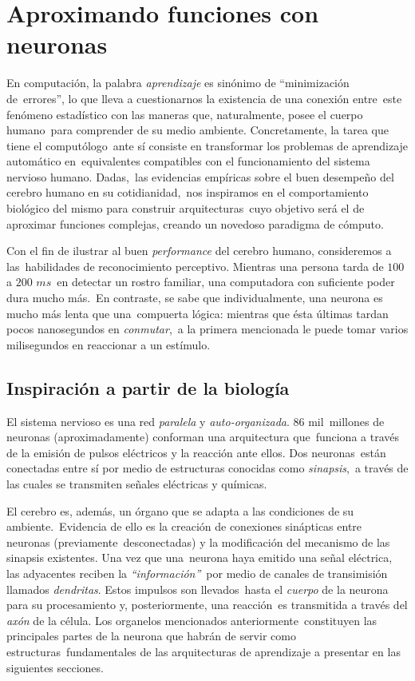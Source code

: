\section{Aproximando funciones con neuronas}

\noindent
En computación, la palabra \emph{aprendizaje} es sinónimo de ``minimización de\
errores'', lo que lleva a cuestionarnos la existencia de una conexión entre\
este fenómeno estadístico con las maneras que, naturalmente, posee el cuerpo humano\
para comprender de su medio ambiente. Concretamente, la tarea que tiene el computólogo\
ante sí consiste en transformar los problemas de aprendizaje automático en\
equivalentes compatibles con el funcionamiento del sistema nervioso humano. Dadas,\
las evidencias empíricas sobre el buen desempeño del cerebro humano en su cotidianidad,\
nos inspiramos en el comportamiento biológico del mismo para construir arquitecturas\
cuyo objetivo será el de aproximar funciones complejas, creando un novedoso paradigma de cómputo.\par
Con el fin de ilustrar al buen \emph{performance} del cerebro humano, consideremos a las\
habilidades de reconocimiento perceptivo. Mientras una persona tarda de $100$ a $200$ $ms$\
en detectar un rostro familiar, una computadora con suficiente poder dura mucho más.\cite{haykin2009}\
En contraste, se sabe que individualmente, una neurona es mucho más lenta que una\
compuerta lógica: mientras que ésta últimas tardan pocos nanosegundos en \emph{conmutar},\
a la primera mencionada le puede tomar varios milisegundos en reaccionar a un estímulo.

\subsection{Inspiración a partir de la biología}

\noindent
El sistema nervioso es una red \emph{paralela} y \emph{auto-organizada}. $86$ mil\
millones de neuronas (aproximadamente) \cite{website:nature:scitable} conforman una arquitectura que\
funciona a través de la emisión de pulsos eléctricos y la reacción ante ellos. Dos neuronas\
están conectadas entre sí por medio de estructuras conocidas como \emph{sinapsis},\
a través de las cuales se transmiten señales eléctricas y químicas.\par
El cerebro es, además, un órgano que se adapta a las condiciones de su ambiente.\
Evidencia de ello es la creación de conexiones sinápticas entre neuronas (previamente\
desconectadas) y la modificación del mecanismo de las sinapsis existentes. Una vez que una\
neurona haya emitido una señal eléctrica, las adyacentes reciben la \emph{``información''}\
por medio de canales de transimisión llamados \emph{dendritas}. Estos impulsos son llevados\
hasta el \emph{cuerpo} de la neurona para su procesamiento y, posteriormente, una reacción\
es transmitida a través del \emph{axón} de la célula. Los organelos mencionados anteriormente\
constituyen las principales partes de la neurona que habrán de servir como estructuras\
fundamentales de las arquitecturas de aprendizaje a presentar en las siguientes secciones.\cite{rojas1996}

